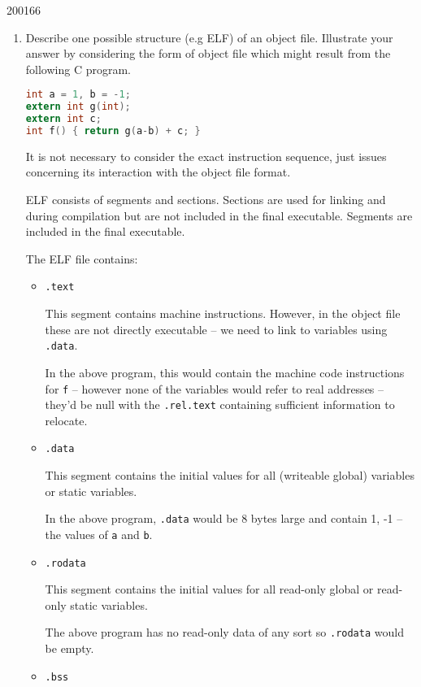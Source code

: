 \documentclass[10pt,\jkfside,a4paper]{article}
\begin{document}
\begin{examquestion}{2001}{6}{6}

\begin{enumerate}

\item Describe one possible structure (e.g ELF) of an object file.
Illustrate your answer by considering the form of object file which might
result from the following C program.
\begin{lstlisting}[language=C]
int a = 1, b = -1;
extern int g(int);
extern int c;
int f() { return g(a-b) + c; }
\end{lstlisting}

It is not necessary to consider the exact instruction sequence, just issues
concerning its interaction with the object file format.

ELF consists of segments and sections. Sections are used for linking and
during compilation but are not included in the final executable. Segments
are included in the final executable.

The ELF file contains:
\begin{itemize}

\item \texttt{.text}

This segment contains machine instructions. However, in the object file
these are not directly executable -- we need to link to variables using
\texttt{.data}.

In the above program, this would contain the machine code instructions for
\texttt{f} -- however none of the variables would refer to real addresses
-- they'd be null with the \texttt{.rel.text} containing sufficient
information to relocate.

\item \texttt{.data}

This segment contains the initial values for all (writeable global)
variables or static variables.

In the above program, \texttt{.data} would be 8 bytes large and contain 1,
-1 -- the values of \texttt{a} and \texttt{b}.

\item \texttt{.rodata}

This segment contains the initial values for all read-only global or
read-only static variables.

The above program has no read-only data of any sort so \texttt{.rodata}
would be empty.

\item \texttt{.bss}


\end{itemize}
\end{enumerate}
\end{examquestion}
\end{document}
